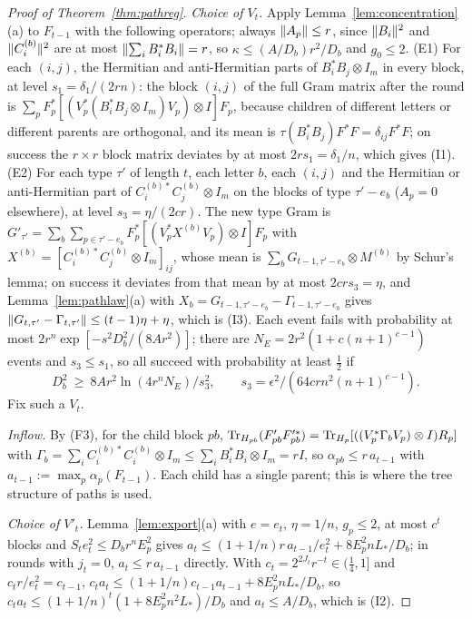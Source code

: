 \begin{proof}[Proof of Theorem~\ref{thm:pathreg}]
\emph{Choice of $V_t$.} Apply Lemma~\ref{lem:concentration}(a) to $F_{t-1}$ with the following operators; always $\lVert A_p\rVert\le r$, since $\lVert B_i\rVert^2$ and
$\lVert C^{(b)}_i\rVert^2$ are at most $\lVert \sum_iB_i^*B_i\rVert=r$, so $\kappa\le(A/D_b)r^2/D_b$ and $g_0\le2$. (E1) For each $(i,j)$, the Hermitian and anti-Hermitian parts of
$B_i^*B_j\otimes I_m$ in every block, at level $s_1=\delta_1/(2rn)$: the block $(i,j)$ of the full Gram matrix after the round is
$\sum_pF_p^*[(V_p^*(B_i^*B_j\otimes I_m)V_p)\otimes I]F_p$, because children of different letters or different parents are orthogonal, and its mean is
$\tau(B_i^*B_j)F^*F=\delta_{ij}F^*F$; on success the $r\times r$ block matrix deviates by at most $2rs_1=\delta_1/n$, which gives (I1). (E2) For each type $\tau'$ of
length $t$, each letter $b$, each $(i,j)$ and the Hermitian or anti-Hermitian part of $C^{(b)*}_iC^{(b)}_j\otimes I_m$ on the blocks of type $\tau'-e_b$ ($A_p=0$ elsewhere),
at level $s_3=\eta/(2cr)$. The new type Gram is $G'_{\tau'}=\sum_b\sum_{p\in\tau'-e_b}F_p^*[(V_p^*X^{(b)}V_p)\otimes I]F_p$ with
$X^{(b)}=[C^{(b)*}_iC^{(b)}_j\otimes I_m]_{ij}$, whose mean is $\sum_bG_{t-1,\tau'-e_b}\otimes M^{(b)}$ by Schur's lemma; on success it deviates from that mean by at most
$2crs_3=\eta$, and Lemma~\ref{lem:pathlaw}(a) with $X_b=G_{t-1,\tau'-e_b}-\Gamma_{t-1,\tau'-e_b}$ gives $\lVert G_{t,\tau'}-\Gamma_{t,\tau'}\rVert\le(t-1)\eta+\eta$, which is (I3).
Each event fails with probability at most $2r^n\exp[-s^2D_b^2/(8Ar^2)]$; there are $N_E=2r^2(1+c(n+1)^{c-1})$ events and $s_3\le s_1$, so all succeed with
probability at least $\frac12$ if
\begin{equation}\label{eq:Db}
D_b^2\ \ge\ 8Ar^2\ln(4r^nN_E)/s_3^2,\qquad s_3=\epsilon^2/(64crn^2(n+1)^{c-1}).
\end{equation}
Fix such a $V_t$.

\emph{Inflow.} By (F3), for the child block $pb$, $\operatorname{Tr}_{H_{pb}}(F'_{pb}F'^*_{pb})=\operatorname{Tr}_{H_p}[((V_p^*\Gamma_bV_p)\otimes I)R_p]$ with
$\Gamma_b=\sum_iC^{(b)*}_iC^{(b)}_i\otimes I_m\le\sum_iB_i^*B_i\otimes I_m=rI$, so $\alpha_{pb}\le r\,a_{t-1}$ with $a_{t-1}:=\max_p\alpha_p(F_{t-1})$. Each child has a single
parent; this is where the tree structure of paths is used.

\emph{Choice of $V'_t$.} Lemma~\ref{lem:export}(a) with $e=e_t$, $\eta=1/n$, $g_p\le2$, at most $c^t$ blocks and $S_te_t^2\le D_br^nE_p^2$ gives
$a_t\le(1+1/n)r\,a_{t-1}/e_t^2+8E_p^2nL_*/D_b$; in rounds with $j_t=0$, $a_t\le r\,a_{t-1}$ directly. With $c_t=2^{2J_t}r^{-t}\in(\frac14,1]$ and $c_tr/e_t^2=c_{t-1}$,
$c_ta_t\le(1+1/n)c_{t-1}a_{t-1}+8E_p^2nL_*/D_b$, so $c_ta_t\le(1+1/n)^t(1+8E_p^2n^2L_*)/D_b$ and $a_t\le A/D_b$, which is (I2).


\end{proof}
